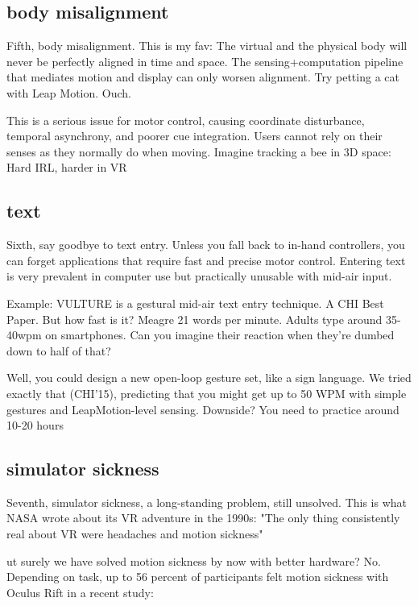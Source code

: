 \subsection{body misalignment}
Fifth, body misalignment. This is my fav: The virtual and the physical body will never be perfectly aligned in time and space. The sensing+computation pipeline that mediates motion and display can only worsen alignment. Try petting a cat with Leap Motion. Ouch.

This is a serious issue for motor control, causing coordinate disturbance, temporal asynchrony, and poorer cue integration. Users cannot rely on their senses as they normally do when moving. Imagine tracking a bee in 3D space: Hard IRL, harder in VR


\subsection{text}
Sixth, say goodbye to text entry. Unless you fall back to in-hand controllers, you can forget applications that require fast and precise motor control. Entering text is very prevalent in computer use but practically unusable with mid-air input. 



Example: VULTURE is a gestural mid-air text entry technique. A CHI Best Paper. But how fast is it? Meagre 21 words per minute.  Adults type around 35-40wpm on smartphones. Can you imagine their reaction when they're dumbed down to half of that?

Well, you could design a new open-loop gesture set, like a sign language. We tried exactly that (CHI'15), predicting that you might get up to 50 WPM with simple gestures and LeapMotion-level sensing. Downside? You need to practice around 10-20 hours


\subsection{simulator sickness}
Seventh, simulator sickness, a long-standing problem, still unsolved. This is what NASA wrote about its VR adventure in the 1990s: "The only thing consistently real about VR were headaches and motion sickness" 

ut surely we have solved motion sickness by now with better hardware? No. Depending on task, up to 56 percent of participants felt motion sickness with Oculus Rift in a recent study: 


